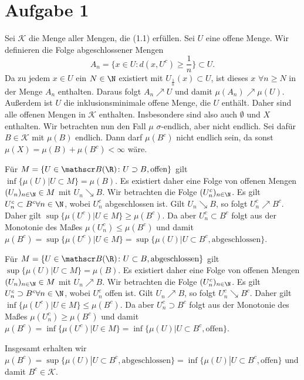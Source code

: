 \documentclass{article}
\begin{document}
\def\headheight{25pt}
    \section*{Aufgabe 1}    
    Sei $\mathscr{K}$ die Menge aller Mengen, die (1.1) erfüllen.
    Sei $U$ eine offene Menge. Wir definieren die Folge abgeschlossener Mengen 
    \[A_n = \{x \in U\colon d(x, U^c) \geq \frac{1}{n}\} \subset U.\]
    Da zu jedem $x \in U$ ein $N \in \N$ existiert mit $U_{\frac{1}{n}}(x) \subset U$, ist dieses $x$ $\forall n \geq N$ in der Menge $A_n$ enthalten. Daraus folgt $A_n \nearrow U$ und damit $\mu(A_n) \nearrow \mu(U)$. Außerdem ist $U$ die inklusionsminimale offene Menge, die $U$ enthält. Daher sind alle offenen Mengen in $\mathscr K$ enthalten. Insbesondere sind also auch $\emptyset$ und $X$ enthalten. 
    Wir betrachten nun den Fall $\mu$ $\sigma$-endlich, aber nicht endlich. 
    Sei dafür $B \in \mathscr K$ mit $\mu(B)$ endlich. Dann darf $\mu(B^c)$ nicht endlich sein, da sonst $\mu(X) = \mu(B) + \mu(B^c) < \infty$ wäre. 
    
    Für $M = \{U \in \mathscr B(\R) \colon U \supset B, \text{offen}\}$ gilt $\inf \{\mu(U) | U \subset M\} = \mu(B)$. Es existiert daher eine Folge von offenen Mengen $(U_n)_{n\in\N} \in M$ mit $U_n \searrow B$.
    Wir betrachten die Folge $(U_n^c)_{n\in\N}$. Es gilt $U_n^c \subset B^c \forall n \in \N$, wobei $U_n^c$ abgeschlossen ist.
    Gilt $U_n \searrow B$, so folgt $U_n^c \nearrow B^c$. Daher gilt $\sup \{\mu(U^c) | U \in M\} \geq \mu(B^c)$. Da aber $U_n^c \subset B^c$ folgt aus der Monotonie des Maßes $\mu(U_n^c) \leq \mu(B^c)$ und damit $\mu(B^c) = \sup \{\mu(U^c) | U\in M\} = \sup \{\mu(U) | U \subset B^c, \text{abgeschlossen}\}$.

    Für $M = \{U \in \mathscr B(\R) \colon U \subset B, \text{abgeschlossen}\}$ gilt $\sup \{\mu(U) | U \subset M\} = \mu(B)$. Es existiert daher eine Folge von offenen Mengen $(U_n)_{n\in\N} \in M$ mit $U_n \nearrow B$.
    Wir betrachten die Folge $(U_n^c)_{n\in\N}$. Es gilt $U_n^c \supset B^c \forall n \in \N$, wobei $U_n^c$ offen ist.
    Gilt $U_n \nearrow B$, so folgt $U_n^c \searrow B^c$. Daher gilt $\inf \{\mu(U^c) | U \in M\} \leq \mu(B^c)$. Da aber $U_n^c \supset B^c$ folgt aus der Monotonie des Maßes $\mu(U_n^c) \geq \mu(B^c)$ und damit $\mu(B^c) = \inf \{\mu(U^c) | U\in M\} = \inf \{\mu(U) | U \subset B^c, \text{offen}\}$.
    
    Insgesamt erhalten wir $\mu(B^c) = \sup \{\mu(U) | U \subset B^c, \text{abgeschlossen}\} = \inf \{\mu(U) | U \subset B^c, \text{offen}\}$ und damit $B^c \in \mathscr K$.
\end{document}
